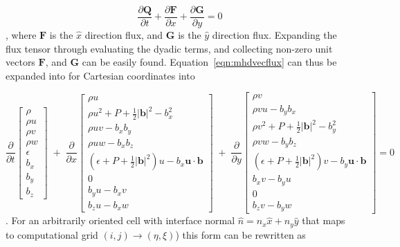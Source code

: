 \documentclass[paper=a4, fontsize=11pt]{scrartcl}
\newcommand{\pfrac}[2]{\frac{\partial#1}{\partial#2}}
\numberwithin{equation}{section}                %
\numberwithin{figure}{section}                  %
\numberwithin{table}{section}                           %
\begin{document}
\begin{equation} \label{eqn:mhdvecflux}
  \pfrac{\mathbf{Q}}{t} + \pfrac{\mathbf{F}}{x} + \pfrac{\mathbf{G}}{y} = 0
\end{equation},
where $\mathbf{F}$ is the $\hat{x}$ direction flux, and $\mathbf{G}$ is the $\hat{y}$ direction flux. Expanding the flux tensor through evaluating the dyadic terms, and collecting non-zero unit vectors $\mathbf{F}$, and $\mathbf{G}$ can be easily found. Equation~\ref{eqn:mhdvecflux} can thus be expanded into for Cartesian coordinates into

\[
  \pfrac{}{t}
  \begin{bmatrix}
    \rho  \\
    \rho u  \\
    \rho v \\
    \rho w \\
    \epsilon\\
    b_x \\
    b_y \\
    b_z 
  \end{bmatrix}
  \;+\;\pfrac{}{x}
  \begin{bmatrix}
    \rho u  \\
    \rho u^2 + P + \frac{1}{2}|\mathbf{b}|^2 - b_x^2\\
    \rho u v - b_x b_y \\
    \rho u w - b_x b_z \\
    \left(\epsilon+ P + \frac{1}{2}|\mathbf{b}|^2 \right) u - b_x \mathbf{u}\cdot\mathbf{b}\\
    0 \\
    b_y u - b_x v \\
    b_z u - b_x w 
  \end{bmatrix}
  \;+\;\pfrac{}{y}
  \begin{bmatrix}
    \rho v  \\
    \rho v u - b_y b_x\\
    \rho v^2 + P + \frac{1}{2}|\mathbf{b}|^2 - b_y^2\\
    \rho v w - b_y b_z \\
    \left(\epsilon+ P + \frac{1}{2}|\mathbf{b}|^2  \right) v - b_y\mathbf{u}\cdot\mathbf{b}\\
    b_x v - b_y u \\
    0 \\
    b_z v - b_y w 
  \end{bmatrix}
  =0
\]
. For an arbitrarily oriented cell with interface normal $\hat{n} = n_x \hat{x} + n_y\hat{y}$ that maps to computational grid $(i,j)\rightarrow(\eta,\xi)$) this form can be rewritten as
\end{document}
